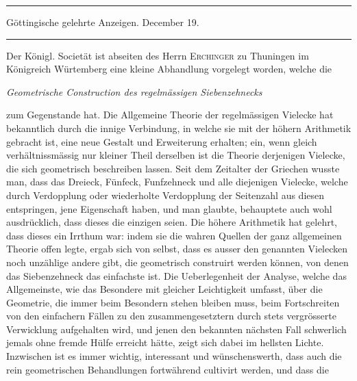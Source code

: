 \begin{center}
\rule{.86\linewidth}{.3pt}\par
Göttingische gelehrte Anzeigen. December 19.\par
\rule{.86\linewidth}{.3pt}
\end{center}
Der Königl. Societät ist abseiten des Herrn \textsc{Erchinger} zu Thuningen im Königreich Würtemberg eine kleine Abhandlung vorgelegt worden, welche die
\begin{center}\emph{Geometrische Construction des regelmässigen Siebenzehnecks}\end{center}
zum Gegenstande hat. Die Allgemeine Theorie der regelmässigen Vielecke hat bekanntlich durch die innige Verbindung, in welche sie mit der höhern Arithmetik gebracht ist, eine neue Gestalt und Erweiterung erhalten; ein, wenn gleich verhältnissmässig nur kleiner Theil derselben ist die Theorie derjenigen Vielecke, die sich geometrisch beschreiben lassen. Seit dem Zeitalter der Griechen wusste man, dass das Dreieck, Fünfeck, Funfzehneck und alle diejenigen Vielecke, welche durch Verdopplung oder wiederholte Verdopplung der Seitenzahl aus diesen entspringen, jene Eigenschaft haben, und man glaubte, behauptete auch wohl ausdrücklich, dass dieses die einzigen seien. Die höhere Arithmetik hat gelehrt, dass dieses ein Irrthum war: indem sie die wahren Quellen der ganz allgemeinen Theorie offen legte, ergab sich von selbst, dass es ausser den genannten Vielecken noch unzählige andere gibt, die geometrisch construirt werden können, von denen das Siebenzehneck das einfachste ist. Die Ueberlegenheit der Analyse, welche das Allgemeinste, wie das Besondere mit gleicher Leichtigkeit umfasst, über die Geometrie, die immer beim Besondern stehen bleiben muss, beim Fortschreiten von den einfachern Fällen zu den zusammengesetztern durch stets vergrösserte Verwicklung aufgehalten wird, und jenen den bekannten nächsten Fall schwerlich jemals ohne fremde Hülfe erreicht hätte, zeigt sich dabei im hellsten Lichte. Inzwischen ist es immer wichtig, interessant und wünschenswerth, dass auch die rein geometrischen Behandlungen fortwährend cultivirt werden, und dass die 
